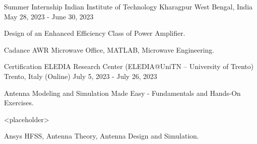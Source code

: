 

\begin{cventries}

  \cventry
    {Summer Internship} %
    {Indian Institute of Technology Kharagpur} %
    {West Bengal, India} %
    {May 28, 2023 - June 30, 2023} %
    {
      \begin{cvitems} %
        \item {Design of an Enhanced Efficiency Class of Power Amplifier.}
        \item { Cadance AWR Microwave Office, MATLAB, Microwave Engineering.}
      \end{cvitems}
    }


\cventry
{Certification} %
{ELEDIA Research Center (ELEDIA@UniTN – University of Trento)} %
{Trento, Italy (Online)} %
{July 5, 2023 - July 26, 2023} %
{
	\begin{cvitems} %
		\item {Antenna Modeling and Simulation Made Easy - Fundamentals and Hands-On Exercises.}
		\item {<placeholder>}
		\item { Ansys HFSS, Antenna Theory, Antenna Design and Simulation.}
	\end{cvitems}
}

\end{cventries}
